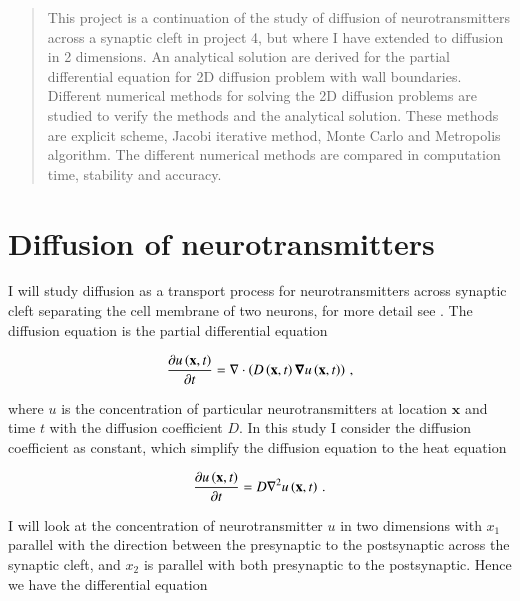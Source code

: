 \documentclass[11pt,english,a4paper]{article}
\begin{document}
\maketitle
\begin{flushleft}

\begin{abstract}
This project is a continuation of the study of diffusion of neurotransmitters across a synaptic cleft in project 4, but where I have extended to diffusion in 2 dimensions. An analytical solution are derived for the partial differential equation for 2D diffusion problem with wall boundaries. Different numerical methods for solving the 2D diffusion problems are studied to verify the methods and the analytical solution. These methods are explicit scheme, Jacobi iterative method, Monte Carlo and Metropolis algorithm. The different numerical methods are compared in computation time, stability and accuracy.
\end{abstract}

\section{Diffusion of neurotransmitters}

I will study diffusion as a transport process for neurotransmitters  across synaptic cleft separating the cell membrane of two neurons, for more detail see \cite{project4}. The diffusion equation is the partial differential equation 

\begin{align*}
\frac{\partial u\left({\textbf{x},t}\right)}{\partial t} = \nabla \cdot\left({D\left({\textbf{x},t}\right)\boldsymbol{\nabla} u\left({\textbf{x},t}\right)}\right)\,,
\end{align*}

where $u$ is the concentration of particular neurotransmitters at location $\textbf{x}$ and time $t$ with the diffusion coefficient $D$. In this study I consider the diffusion coefficient as constant, which simplify the diffusion equation to the heat equation

\begin{align*}
\frac{\partial u\left({\textbf{x},t}\right)}{\partial t} = D\nabla^2 u\left({\textbf{x},t}\right)\,.
\end{align*}

I will look at the concentration of neurotransmitter $u$ in two dimensions with $x_1$ parallel with the direction between the presynaptic to the postsynaptic across the synaptic cleft, and $x_2$ is parallel with both presynaptic to the postsynaptic. Hence we have the differential equation


\end{flushleft}
\end{document}
